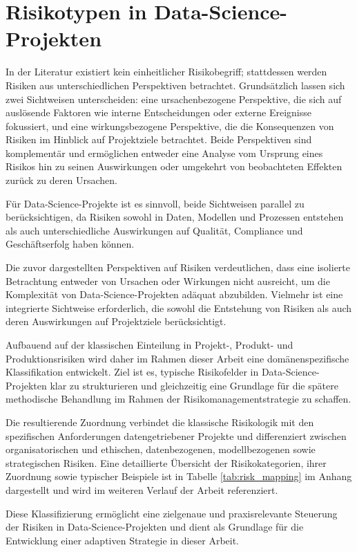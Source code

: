 \section{Risikotypen in Data-Science-Projekten}

In der Literatur existiert kein einheitlicher Risikobegriff; 
stattdessen werden Risiken aus unterschiedlichen Perspektiven betrachtet. 
Grundsätzlich lassen sich zwei Sichtweisen unterscheiden: 
eine ursachenbezogene Perspektive, die sich auf auslösende Faktoren wie interne 
Entscheidungen oder externe Ereignisse fokussiert, und eine wirkungsbezogene Perspektive, 
die die Konsequenzen von Risiken im Hinblick auf Projektziele betrachtet. 
Beide Perspektiven sind komplementär und ermöglichen entweder eine Analyse vom 
Ursprung eines Risikos hin zu seinen Auswirkungen oder umgekehrt von beobachteten Effekten zurück zu deren Ursachen.

Für Data-Science-Projekte ist es sinnvoll, beide Sichtweisen parallel zu berücksichtigen, 
da Risiken sowohl in Daten, Modellen und Prozessen entstehen als auch unterschiedliche Auswirkungen auf Qualität, 
Compliance und Geschäftserfolg haben können.

Die zuvor dargestellten Perspektiven auf Risiken verdeutlichen, 
dass eine isolierte Betrachtung entweder von Ursachen oder Wirkungen nicht ausreicht, 
um die Komplexität von Data-Science-Projekten adäquat abzubilden. 
Vielmehr ist eine integrierte Sichtweise erforderlich, 
die sowohl die Entstehung von Risiken als auch deren Auswirkungen auf Projektziele berücksichtigt.

Aufbauend auf der klassischen Einteilung in Projekt-, Produkt- und Produktionsrisiken 
wird daher im Rahmen dieser Arbeit eine domänenspezifische Klassifikation entwickelt. 
Ziel ist es, typische Risikofelder in Data-Science-Projekten klar zu strukturieren und 
gleichzeitig eine Grundlage für die spätere methodische Behandlung im Rahmen der Risikomanagementstrategie zu schaffen.

Die resultierende Zuordnung verbindet die klassische Risikologik mit den 
spezifischen Anforderungen datengetriebener Projekte und differenziert zwischen organisatorischen 
und ethischen, datenbezogenen, modellbezogenen sowie strategischen Risiken. 
Eine detaillierte Übersicht der Risikokategorien, ihrer Zuordnung sowie typischer Beispiele 
ist in Tabelle \hyperref[tab:risk_mapping]{\ref{tab:risk_mapping}} im Anhang dargestellt und wird im weiteren Verlauf der Arbeit referenziert.

Diese Klassifizierung ermöglicht eine zielgenaue und praxisrelevante Steuerung der Risiken in Data-Science-Projekten 
und dient als Grundlage für die Entwicklung einer adaptiven Strategie in dieser Arbeit.